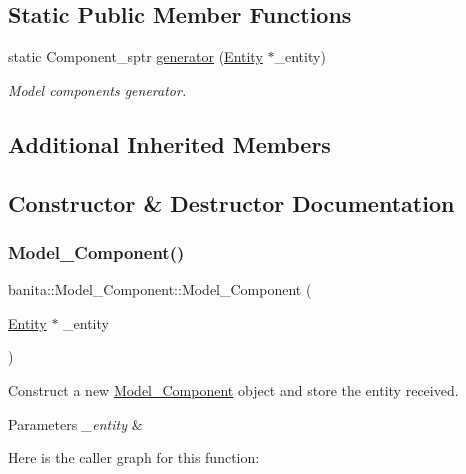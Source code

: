 \subsection*{Static Public Member Functions}
\begin{DoxyCompactItemize}
\item 
static Component\+\_\+sptr \mbox{\hyperlink{classbanita_1_1_model___component_a4a5d4212e321577342bc1a8f4c997ca9}{generator}} (\mbox{\hyperlink{classbanita_1_1_entity}{Entity}} $\ast$\+\_\+entity)
\begin{DoxyCompactList}\small\item\em Model component\textquotesingle{}s generator. \end{DoxyCompactList}\end{DoxyCompactItemize}
\subsection*{Additional Inherited Members}


\subsection{Constructor \& Destructor Documentation}
\mbox{\label{classbanita_1_1_model___component_a2f9baa86605d6d152e69cd73af41cf7b}} 
\subsubsection{\texorpdfstring{Model\_Component()}{Model\_Component()}\hspace{0.1cm}{\footnotesize\ttfamily [1/2]}}
{\footnotesize\ttfamily banita\+::\+Model\+\_\+\+Component\+::\+Model\+\_\+\+Component (\begin{DoxyParamCaption}\item[{\mbox{\hyperlink{classbanita_1_1_entity}{Entity}} $\ast$}]{\+\_\+entity }\end{DoxyParamCaption})}



Construct a new \mbox{\hyperlink{classbanita_1_1_model___component}{Model\+\_\+\+Component}} object and store the entity received. 


\begin{DoxyParams}{Parameters}
{\em \+\_\+entity} & \\
\hline
\end{DoxyParams}
Here is the caller graph for this function\+:
\mbox{\label{classbanita_1_1_model___component_aa8bdeb97075af832ea0c0f32b302e799}} 
